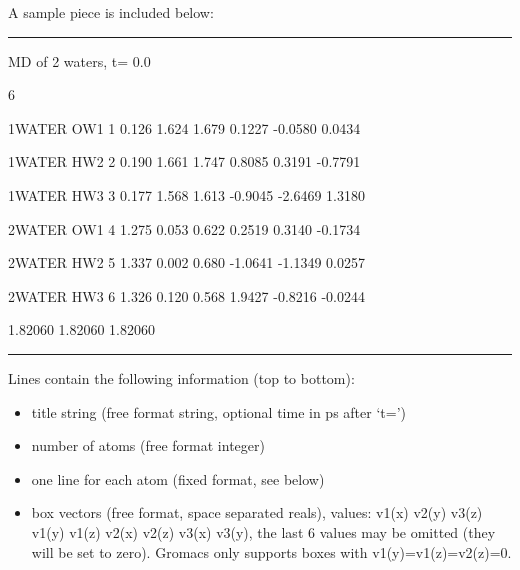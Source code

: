 \documentclass[letterpaper,10pt,english]{sphinxmanual}
\begin{document}
A sample piece is included below:


\bigskip\hrule{}\bigskip


MD of 2 waters, t= 0.0

6

1WATER  OW1    1   0.126   1.624   1.679  0.1227 -0.0580  0.0434

1WATER  HW2    2   0.190   1.661   1.747  0.8085  0.3191 -0.7791

1WATER  HW3    3   0.177   1.568   1.613 -0.9045 -2.6469  1.3180

2WATER  OW1    4   1.275   0.053   0.622  0.2519  0.3140 -0.1734

2WATER  HW2    5   1.337   0.002   0.680 -1.0641 -1.1349  0.0257

2WATER  HW3    6   1.326   0.120   0.568  1.9427 -0.8216 -0.0244

1.82060   1.82060   1.82060


\bigskip\hrule{}\bigskip


Lines contain the following information (top to bottom):
\begin{itemize}
\item {} 
title string (free format string, optional time in ps after `t=')

\item {} 
number of atoms (free format integer)

\item {} 
one line for each atom (fixed format, see below)

\item {} 
box vectors (free format, space separated reals), values: v1(x) v2(y) v3(z)
v1(y) v1(z) v2(x) v2(z) v3(x) v3(y), the last 6 values may be omitted (they will
be set to zero). Gromacs only supports boxes with v1(y)=v1(z)=v2(z)=0.

\end{itemize}
\end{document}
